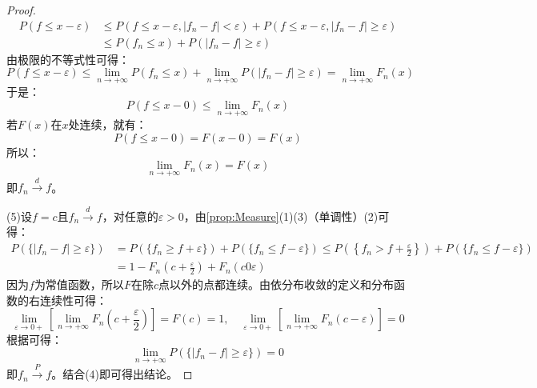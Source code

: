 \begin{proof}
	\begin{align*}
		P(f\leqslant x-\varepsilon)&\leqslant P(f\leqslant x-\varepsilon,|f_n-f|<\varepsilon)+P(f\leqslant x-\varepsilon,|f_n-f|\geqslant \varepsilon) \\
		&\leqslant P(f_n\leqslant x)+P(|f_n-f|\geqslant\varepsilon)
	\end{align*}
	由极限的不等式性可得：
	\begin{equation*}
		P(f\leqslant x-\varepsilon)\leqslant\lim_{n\to+\infty}P(f_n\leqslant x)+\lim_{n\to+\infty}P(|f_n-f|\geqslant\varepsilon)=\lim_{n\to+\infty}F_n(x)
	\end{equation*}
	于是：
	\begin{equation*}
		P(f\leqslant x-0)\leqslant\lim_{n\to+\infty}F_n(x)
	\end{equation*}
	若$F(x)$在$x$处连续，就有：
	\begin{equation*}
		P(f\leqslant x-0)=F(x-0)=F(x)
	\end{equation*}
	所以：
	\begin{equation}
		\lim_{n\to+\infty}F_n(x)=F(x)
	\end{equation}
	即$f_n\overset{d}{\longrightarrow}f$。\par
	(5)设$f=c$且$f_n\overset{d}{\longrightarrow}f$，对任意的$\varepsilon>0$，由\cref{prop:Measure}(1)(3)（单调性）(2)可得：
	\begin{align*}
		P(\{|f_n-f|\geqslant\varepsilon\})&=P(\{f_n\geqslant f+\varepsilon\})+P(\{f_n\leqslant f-\varepsilon\})\leqslant P\left(\left\{f_n>f+\frac{\varepsilon}{2}\right\}\right)+P(\{f_n\leqslant f-\varepsilon\}) \\
		&=1-F_n\left(c+\frac{\varepsilon}{2}\right)+F_n(c0\varepsilon)
	\end{align*}
	因为$f$为常值函数，所以$F$在除$c$点以外的点都连续。由依分布收敛的定义和分布函数的右连续性可得：
	\begin{equation*}
		\lim_{\varepsilon\to0+}\left[\lim_{n\to+\infty}F_n\left(c+\frac{\varepsilon}{2}\right)\right]=F(c)=1,\quad\lim_{\varepsilon\to0+}\left[\lim_{n\to+\infty}F_n(c-\varepsilon)\right]=0
	\end{equation*}
	根据可得：
	\begin{equation*}
		\lim_{n\to+\infty}P(\{|f_n-f|\geqslant\varepsilon\})=0
	\end{equation*}
	即$f_n\overset{P}{\longrightarrow}f$。结合(4)即可得出结论。
\end{proof}
